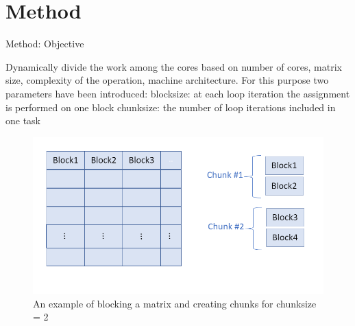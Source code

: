 \documentclass[10pt]{beamer}
\begin{document}



\section{Method}
\begin{frame}{Method: Objective}
	\begin{outline}
		Dynamically divide the work among the cores based on number of cores, matrix size, complexity of the operation, machine architecture.
		For this purpose two parameters have been introduced:
		\1block\textunderscore size: at each loop iteration the assignment is performed on one block
		\1chunk\textunderscore size: the number of loop iterations included in one task 
		\begin{figure}
			\centering
			\includegraphics[width=0.72\linewidth]{images/chunks.png}
			\caption{An example of blocking a matrix and creating chunks for chunk\textunderscore size = 2}	
		\end{figure}	
	\end{outline}
\end{frame}
\end{document}

